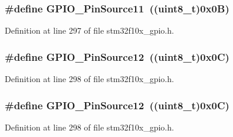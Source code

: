 \subsubsection[{\texorpdfstring{G\+P\+I\+O\+\_\+\+Pin\+Source11}{GPIO_PinSource11}}]{\setlength{\rightskip}{0pt plus 5cm}\#define G\+P\+I\+O\+\_\+\+Pin\+Source11~(({\bf uint8\+\_\+t})0x0\+B)}\hypertarget{group___g_p_i_o___pin__sources_ga446be4a99e84eefb5c71a643211f598b}{}\label{group___g_p_i_o___pin__sources_ga446be4a99e84eefb5c71a643211f598b}


Definition at line 297 of file stm32f10x\+\_\+gpio.\+h.

\subsubsection[{\texorpdfstring{G\+P\+I\+O\+\_\+\+Pin\+Source12}{GPIO_PinSource12}}]{\setlength{\rightskip}{0pt plus 5cm}\#define G\+P\+I\+O\+\_\+\+Pin\+Source12~(({\bf uint8\+\_\+t})0x0\+C)}\hypertarget{group___g_p_i_o___pin__sources_gaaa64892c00d50b0fa49f0ce72a83e6e0}{}\label{group___g_p_i_o___pin__sources_gaaa64892c00d50b0fa49f0ce72a83e6e0}


Definition at line 298 of file stm32f10x\+\_\+gpio.\+h.

\subsubsection[{\texorpdfstring{G\+P\+I\+O\+\_\+\+Pin\+Source12}{GPIO_PinSource12}}]{\setlength{\rightskip}{0pt plus 5cm}\#define G\+P\+I\+O\+\_\+\+Pin\+Source12~(({\bf uint8\+\_\+t})0x0\+C)}\hypertarget{group___g_p_i_o___pin__sources_gaaa64892c00d50b0fa49f0ce72a83e6e0}{}\label{group___g_p_i_o___pin__sources_gaaa64892c00d50b0fa49f0ce72a83e6e0}


Definition at line 298 of file stm32f10x\+\_\+gpio.\+h.

